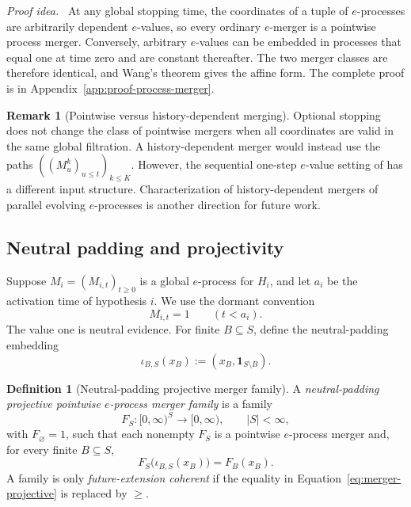 \documentclass[11pt]{article}
\numberwithin{equation}{section}
\theoremstyle{plain}
\theoremstyle{definition}
\newtheorem{definition}[theorem]{Definition}
\newtheorem{remark}[theorem]{Remark}
\newcommand{\proofidea}{\par\medskip\noindent\textit{Proof idea.}\ }
\begin{document}
\proofidea
At any global stopping time, the coordinates of a tuple of $e$-processes are arbitrarily dependent $e$-values, so every ordinary $e$-merger is a pointwise process merger. Conversely, arbitrary $e$-values can be embedded in processes that equal one at time zero and are constant thereafter. The two merger classes are therefore identical, and Wang's theorem gives the affine form. The complete proof is in Appendix~\ref{app:proof-process-merger}.

\begin{remark}[Pointwise versus history-dependent merging]\label{rem:process-merger-scope}
Optional stopping does not change the class of pointwise mergers when all coordinates are valid in the same global filtration. A history-dependent merger would instead use the paths $((M_u^k)_{u\leq t})_{k\leq K}$. However, the sequential one-step $e$-value setting of \citet{VovkWang2024Sequential} has a different input structure. Characterization of history-dependent mergers of parallel evolving $e$-processes is another direction for future work.
\end{remark}

\subsection{Neutral padding and projectivity}\label{sec:weighted-construction}

Suppose $M_i=(M_{i,t})_{t\geq0}$ is a global $e$-process for $H_i$, and let $a_i$ be the activation time of hypothesis $i$. We use the dormant convention
\begin{equation}\label{eq:dormant}
  M_{i,t}=1\qquad(t<a_i).
\end{equation}
The value one is neutral evidence. For finite $B\subseteq S$, define the neutral-padding embedding
\begin{equation}\label{eq:padding-map}
  \iota_{B,S}(x_B):=(x_B,\mathbf1_{S\setminus B}).
\end{equation}

\begin{definition}[Neutral-padding projective merger family]\label{def:projective-merger}
A \emph{neutral-padding projective pointwise $e$-process merger family} is a family
\[
  F_S:[0,\infty)^S\to[0,\infty),\qquad |S|<\infty,
\]
with $F_\varnothing=1$, such that each nonempty $F_S$ is a pointwise $e$-process merger and, for every finite $B\subseteq S$,
\begin{equation}\label{eq:merger-projective}
  F_S\bigl(\iota_{B,S}(x_B)\bigr)=F_B(x_B).
\end{equation}
A family is only \emph{future-extension coherent} if the equality in Equation~\eqref{eq:merger-projective} is replaced by $\geq$.
\end{definition}
\end{document}
